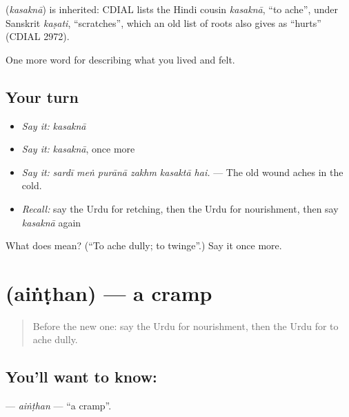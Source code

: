 \begin{cousinweb}
\textbf{} (\emph{kasaknā}) is inherited: CDIAL lists the Hindi cousin \emph{kasaknā}, \textquotedblleft{}to ache\textquotedblright{}, under Sanskrit \emph{kaṣati}, \textquotedblleft{}scratches\textquotedblright{}, which an old list of roots also gives as \textquotedblleft{}hurts\textquotedblright{} (CDIAL 2972).
\end{cousinweb}

\begin{grammarlens}[title={What you've built}]
One more word for describing what you lived and felt.
\end{grammarlens}

\subsection*{Your turn}
\begin{itemize}
\raggedright
  \item \emph{Say it:} \emph{kasaknā}
  \item \emph{Say it:} \emph{kasaknā}, once more
  \item \emph{Say it:} \emph{sardī meṅ purānā zakhm kasaktā hai.} — The old wound aches in the cold.
  \item \emph{Recall:} say the Urdu for retching, then the Urdu for nourishment, then say \emph{kasaknā} again
\end{itemize}

\begin{tcolorbox}[breakable,colback=teal!4,colframe=teal!35!black,title={Before you move on}]
What does  mean? (\textquotedblleft{}To ache dully; to twinge\textquotedblright{}.) Say it once more.
\end{tcolorbox}
\section[\texorpdfstring{\ur{اینٹھن} (aiṅṭhan)}{اینٹھن (aiṅṭhan)}]{ (aiṅṭhan) — a cramp}

\label{lesson:UR-C473-ainthan}



\begin{quote}
Before the new one: say the Urdu for nourishment, then the Urdu for to ache dully.
\end{quote}

\subsection*{You'll want to know: }
\textbf{} — \emph{aiṅṭhan} — \textquotedblleft{}a cramp\textquotedblright{}.

